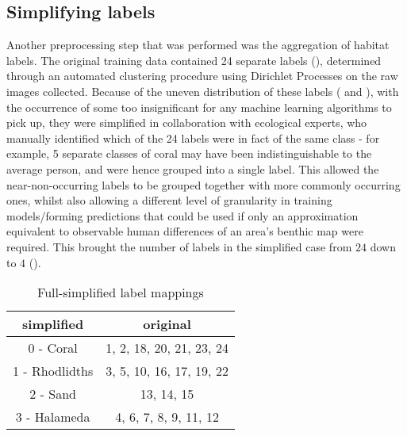 
\subsection{Simplifying labels}
Another preprocessing step that was performed was the aggregation of habitat labels. The original training data contained 24 separate labels (), determined through an automated clustering procedure using Dirichlet Processes on the raw images collected. Because of the uneven distribution of these labels ( and ), with the occurrence of some too insignificant for any machine learning algorithms to pick up, they were simplified in collaboration with ecological experts, who manually identified which of the 24 labels were in fact of the same class - for example, 5 separate classes of coral may have been indistinguishable to the average person, and were hence grouped into a single label. This allowed the near-non-occurring labels to be grouped together with more commonly occurring ones, whilst also allowing a different level of granularity in training models/forming predictions that could be used if only an approximation equivalent to observable human differences of an area's benthic map were required. This brought the number of labels in the simplified case from $24$ down to $4$ (). %

\begin{table}[H]
    \centering
    \begin{tabular}{|c| c|}
        \hline
        simplified & original \\\hline
        0 - Coral  & 1, 2, 18, 20, 21, 23, 24 \\
        1 - Rhodlidths & 3, 5, 10, 16, 17, 19, 22\\
        2 - Sand & 13, 14, 15 \\
        3 - Halameda & 4, 6, 7, 8, 9, 11, 12 \\
        \hline
    \end{tabular}
    \caption{Full-simplified label mappings}
    \label{table:labelmappings}
\end{table}

